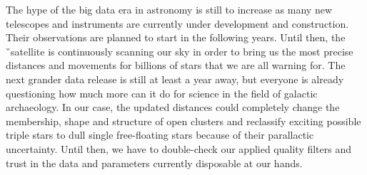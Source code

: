 The hype of the big data era in astronomy is still to increase as many new telescopes and instruments are currently under development and construction. Their observations are planned to start in the following years. Until then, the \G\ satellite is continuously scanning our sky in order to bring us the most precise distances and movements for billions of stars that we are all warning for. The next grander data release is still at least a year away, but everyone is already questioning how much more can it do for science in the field of galactic archaeology. In our case, the updated distances could completely change the membership, shape and structure of open clusters and reclassify exciting possible triple stars to dull single free-floating stars because of their parallactic uncertainty. Until then, we have to double-check our applied quality filters and trust in the data and parameters currently disposable at our hands.